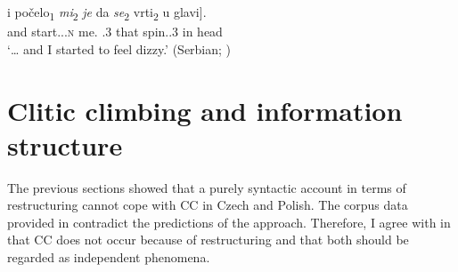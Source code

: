 \documentclass[output=paper,colorlinks,citecolor=brown]{langscibook}
\begin{document}
\ea\label{kul:ex:i-pocelo}
\gll […] i počelo\textsubscript{1} \textit{mi}\textsubscript{2} \textit{je} \minsp{[} da \textit{se}\textsubscript{2} vrti\textsubscript{2} u glavi].\\
{} and start.{\PST.\SG.}\textsc{n} me.{\DAT} {\AUX.3\SG} {} that {\REFL} spin.{\PRS.3\SG} in head\\
\glt `… and I started to feel dizzy.’  \hfill (Serbian; \citealt[307]{KolakovicFritz2022})
\z

\ea\label{kul:ex:lehce-sie}
\z
\z 

\ea\label{kul:ex:my-sie}
\z
\z

\section{Clitic climbing and information structure}\label{kul:sec:cc-inform-structure}

The previous sections showed that a purely syntactic account in terms of restructuring cannot cope with CC in Czech and Polish. The corpus data provided in  contradict the predictions of the approach. Therefore, I agree with \citet[87]{Dotlačil2004} in that CC does not occur because of restructuring and that both should be regarded as independent phenomena.
\end{document}
